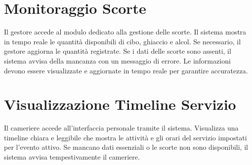 \documentclass[a4paper,12pt]{article}
\begin{document}
\section{\textcolor{sectioncolor}{Monitoraggio Scorte}}
\textcolor{textcolor}{
Il gestore accede al modulo dedicato alla gestione delle scorte. Il sistema mostra in tempo reale le quantità disponibili di cibo, ghiaccio e alcol. Se necessario, il gestore aggiorna le quantità registrate. Se i dati delle scorte sono assenti, il sistema avvisa della mancanza con un messaggio di errore. Le informazioni devono essere visualizzate e aggiornate in tempo reale per garantire accuratezza.
}

\section{\textcolor{sectioncolor}{Visualizzazione Timeline Servizio}}
\textcolor{textcolor}{
Il cameriere accede all’interfaccia personale tramite il sistema. Visualizza una timeline chiara e leggibile che mostra le attività e gli orari del servizio impostati per l’evento attivo. Se mancano dati essenziali o le scorte non sono disponibili, il sistema avvisa tempestivamente il cameriere.
}
\end{document}
